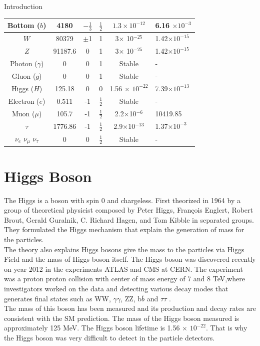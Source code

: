 \begin{chapter}{Introduction}
\begin{table}[!htbp]
\begin{tabular}{|c|c|c|c|c|p{2.5cm}|}
Bottom ($b$)	& 4180 &$-\frac{1}{3}$ & $\frac{1}{2}$ &$1.3 \times 10^{-12}$  & 6.16 $\times 10^{-3}$\\ 
	\hline 
$W$ 	& 80379 &$\pm$1 & 1 & 3$\times$ 10$^{-25}$ & 1.42$\times 10^{-15}$\\ 
	\hline 
$Z$ & 91187.6 &0 & 1 & 3$\times$ 10$^{-25}$ &1.42$\times 10^{-15}$ \\ 
\hline
Photon ($\gamma$) & 0 &0 & 1&Stable & - \\ 
\hline
Gluon ($g$)	& 0 &0 & 1&Stable & - \\ 
	\hline 
Higgs ($H$)	& 125.18 &0 & 0& 1.56 $\times$ $10^{-22}$ & 7.39$\times 10^{-13}$ \\ 
	\hline 
Electron ($e$)& 0.511 & -1 &  $\frac{1}{2}$& Stable & - \\ 
	\hline 
Muon ($\mu$)	& 105.7 & -1 & $\frac{1}{2}$ & 2.2$\times$10$^{-6}$ & 10419.85 \\ 
	\hline 
$\tau$	& 1776.86 &-1 & $\frac{1}{2}$ & 2.9$\times$10$^{-13}$ & 1.37$\times 10^{-3}$\\ 
	\hline 
$\nu_e$	$\nu_\mu$ $\nu_\tau$& 0 & 0 & $\frac{1}{2}$ & Stable & -\\
	\hline 
\end{tabular} 
\label{SM table}
\end{table}
\newpage


\section{Higgs Boson}
The Higgs is a boson with spin 0 and chargeless. First theorized in 1964 by a group of theoretical physicist composed by Peter Higgs, Fran\c cois Englert, Robert Brout, Gerald Guralnik, C. Richard Hagen, and Tom Kibble in separated groups. They formulated the Higgs mechanism that explain the generation of mass for the particles. \\

The theory also explains Higgs bosons give the mass to the particles via Higgs Field and the mass of Higgs boson itself. The Higgs boson was discovered recently on year 2012 in the experiments ATLAS and CMS at CERN. The experiment was a proton proton collision with center of mass energy of 7 and 8 TeV,where investigators worked on the data and detecting various decay modes that generates final states such as WW, $\gamma \gamma$, ZZ, b$\bar{b}$ and $\tau \tau$ \cite{higgsd}. \\
The mass of this boson has been measured and its production and decay
rates are consistent with the SM prediction. The mass of the Higgs boson measured is 
approximately 125 MeV. The Higgs boson lifetime is 1.56 $\times$ $10^{-22}$. That is why the Higgs boson was very difficult to detect in the particle detectors. \\


\end{chapter}
